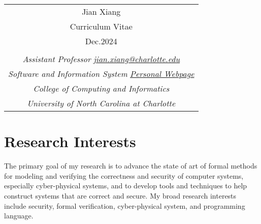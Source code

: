 \documentclass[11pt]{article}
\begin{document}
\renewcommand{\baselinestretch}{1.2} 

\pagestyle{empty} 


\begin{tabularx}{\linewidth}{@{} C @{}}
\Huge{\textsf{Jian Xiang}} \\[7.5pt]
Curriculum Vitae  \\
Dec.2024\\
\\
\noindent \textit{Assistant Professor} \hfill \href{mailto:jian.xiang@charlotte.edu}{\textit{jian.xiang@charlotte.edu}} \\
\noindent \textit{Software and Information System} \hfill { \href{https://www.jianxiang.info}{\textit{Personal Webpage}} } \\
\noindent \textit{College of Computing and Informatics} \hfill  { } \\
\noindent \textit{University of North Carolina at Charlotte}     \hfill  { } \\
\end{tabularx}




\section{Research Interests}

The primary goal of my research is to advance the state of art of formal methods for modeling and verifying the correctness and security of computer systems, especially cyber-physical systems, and to develop tools and techniques to help construct systems that are correct and secure.
%
My broad research interests include security, formal verification, cyber-physical system, and programming language.
\end{document}
